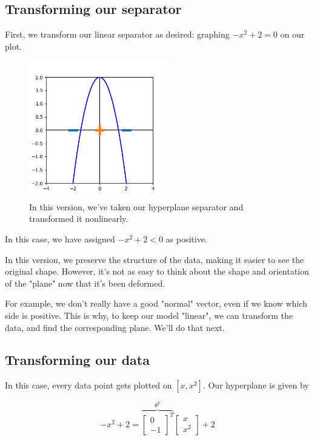         \subsecdiv

        \subsection{Transforming our separator}
    
            First, we transform our linear separator as desired: graphing $-x^2+2=0$ on our plot. 
    
            \begin{figure}[H]
                \centering
                \includegraphics[width=60mm,scale=0.5]{images/feature_images/nonlinear_separator.png}
                \caption*{In this version, we've taken our hyperplane separator and transformed it nonlinearly.}
            \end{figure}
    
            In this case, we have assigned $-x^2+2<0$ as positive.
    
            In this version, we preserve the structure of the data, making it easier to see the original shape. However, it's not as easy to think about the shape and orientation of the "plane" now that it's been deformed. 
            
            For example, we don't really have a good "normal" vector, even if we know which side is positive. This is why, to keep our model "linear", we can transform the data, and find the corresponding plane. We'll do that next.
    
            \subsecdiv

        \subsection{Transforming our data}
    
            In this case, every data point gets plotted on $[x,x^2]$. Our hyperplane is given by 
    
            \begin{equation}
                -x^2+2 = 
                \overbrace{
                \begin{bmatrix}
                    0 \\ -1
                \end{bmatrix}^T
                }^{\theta^T}
                \begin{bmatrix}
                    x \\ x^2
                \end{bmatrix}
                + 2
            \end{equation}
    
